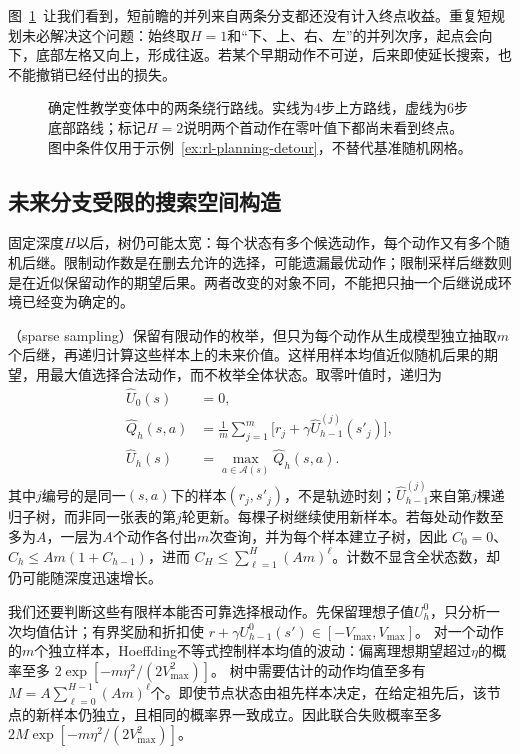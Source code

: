 图~\ref{fig:rl-planning-detour}~让我们看到，短前瞻的并列来自两条分支都还没有计入终点收益。重复短规划未必解决这个问题：始终取$H=1$和“下、上、右、左”的并列次序，起点会向下，底部左格又向上，形成往返。若某个早期动作不可逆，后来即使延长搜索，也不能撤销已经付出的损失。

\begin{figure}[htbp]
 \centering
 
 \caption{确定性教学变体中的两条绕行路线。实线为4步上方路线，虚线为6步底部路线；标记$H=2$说明两个首动作在零叶值下都尚未看到终点。图中条件仅用于示例~\ref{ex:rl-planning-detour}，不替代基准随机网格。}
 \label{fig:rl-planning-detour}
\end{figure}

\subsection{未来分支受限的搜索空间构造}
\label{sec:rl-planning-sparse-search}

固定深度$H$以后，树仍可能太宽：每个状态有多个候选动作，每个动作又有多个随机后继。限制动作数是在删去允许的选择，可能遗漏最优动作；限制采样后继数则是在近似保留动作的期望后果。两者改变的对象不同，不能把只抽一个后继说成环境已经变为确定的。

（sparse sampling）保留有限动作的枚举，但只为每个动作从生成模型独立抽取$m$个后继，再递归计算这些样本上的未来价值。这样用样本均值近似随机后果的期望，用最大值选择合法动作，而不枚举全体状态。取零叶值时，递归为
\begin{equation}
 \begin{aligned}
 \widehat U_0(s)&=0,\\
 \widehat Q_h(s,a)&=\frac1m\sum_{j=1}^{m}
       \bigl[r_j+\gamma\widehat U_{h-1}^{(j)}(s'_j)\bigr],\\
 \widehat U_h(s)&=\max_{a\in\mathcal A(s)}\widehat Q_h(s,a).
 \end{aligned}
 \label{eq:rl-planning-sparse-sampling}
\end{equation}
其中$j$编号的是同一$(s,a)$下的样本$(r_j,s'_j)$，不是轨迹时刻；$\widehat U_{h-1}^{(j)}$来自第$j$棵递归子树，而非同一张表的第$j$轮更新。每棵子树继续使用新样本。若每处动作数至多为$A$，一层为$A$个动作各付出$m$次查询，并为每个样本建立子树，因此
$C_0=0$、$C_h\leq Am(1+C_{h-1})$，进而
$C_H\leq\sum_{\ell=1}^{H}(Am)^\ell$。计数不显含全状态数，却仍可能随深度迅速增长。

我们还要判断这些有限样本能否可靠选择根动作。先保留理想子值$U_h^0$，只分析一次均值估计；有界奖励和折扣使
$r+\gamma U_{h-1}^0(s')\in[-V_{\max},V_{\max}]$。
对一个动作的$m$个独立样本，Hoeffding不等式控制样本均值的波动：偏离理想期望超过$\eta$的概率至多
$2\exp[-m\eta^2/(2V_{\max}^2)]$。
树中需要估计的动作均值至多有
$M=A\sum_{\ell=0}^{H-1}(Am)^\ell$个。即使节点状态由祖先样本决定，在给定祖先后，该节点的新样本仍独立，且相同的概率界一致成立。因此联合失败概率至多
$2M\exp[-m\eta^2/(2V_{\max}^2)]$。

